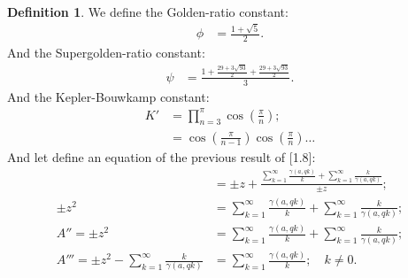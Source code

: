 \documentclass[10pt]{article}
\theoremstyle{plain}
\theoremstyle{definition}
\newtheorem{definition}[theorem]{Definition}
\theoremstyle{remark}
\begin{document}
	\begin{definition}
		We define the Golden-ratio constant:
		\begin{align*}
			\phi &= \frac{1+\sqrt{5}}{2}.
		\end{align*}
		And the Supergolden-ratio constant:
		\begin{align*}
			\psi &= \frac{1+\frac{29+3\sqrt{93}}{2}+\frac{29+3\sqrt{93}}{2}}{3}.
		\end{align*}
		And the Kepler-Bouwkamp constant:
		\begin{align*}
			K' &= \prod_{n=3}^{\pi} \cos(\frac{\pi}{n});\\
			&=  \cos(\frac{\pi}{n-1}) \cos(\frac{\pi}{n}) \dots
		\end{align*}
		And let define an equation of the previous result of [1.8]:
		\begin{align*}
			&= \pm z + \frac{\sum_{k=1}^{\infty} \frac{\gamma(a, qk)}{k} + \sum_{k=1}^{\infty}\frac{k}{\gamma(a, qk)}}{\pm z};\\
			\pm z^2 &= \sum_{k=1}^{\infty} \frac{\gamma(a, qk)}{k} + \sum_{k=1}^{\infty}\frac{k}{\gamma(a, qk)};\\
			A'' = \pm z^2 &= \sum_{k=1}^{\infty} \frac{\gamma(a, qk)}{k} + \sum_{k=1}^{\infty}\frac{k}{\gamma(a, qk)};\\
			A''' = \pm z^{2} - \sum_{k=1}^{\infty}\frac{k}{\gamma(a, qk)} &= \sum_{k=1}^{\infty} \frac{\gamma(a, qk)}{k}; \quad k \neq 0.
		\end{align*}
	\end{definition}
	
	\nocite{*}
	
	
	
\end{document}
